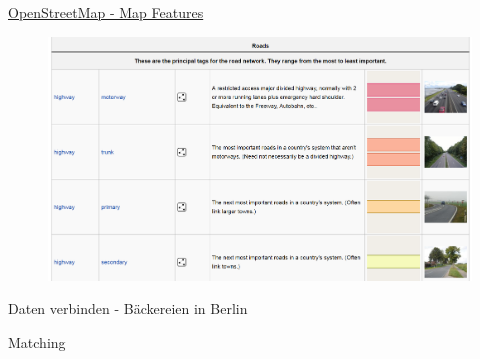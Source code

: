 \begin{frame}{\href{http://wiki.openstreetmap.org/wiki/Map_Features}{OpenStreetMap
- Map Features}}

\begin{figure}
\centering
\includegraphics{figure/OSMroads.PNG}
\caption{}
\end{figure}

\end{frame}

\begin{frame}[fragile]{Daten verbinden - Bäckereien in Berlin}

\begin{Shaded}
\begin{Highlighting}[]
\NormalTok{(}\NormalTok{(}\NormalTok{))}
\end{Highlighting}
\end{Shaded}

\end{frame}

\begin{frame}[fragile]{Matching}

\begin{Shaded}
\begin{Highlighting}[]
\StringTok{ }\OperatorTok{$}
\end{Highlighting}
\end{Shaded}

\begin{Shaded}
\begin{Highlighting}[]
\StringTok{ }\OperatorTok{$}
\end{Highlighting}
\end{Shaded}

\end{frame}

